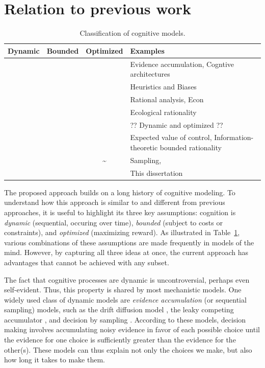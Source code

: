 \section{Relation to previous work}



\newcommand{\yes}{\checkmark &}
\begin{table}[tb]
  \caption{Classification of cognitive models.}
  \label{tab:comparison}
  \centering
  \begin{tabular}{ccc|p{\dimexpr\textwidth - 7cm}}
  \toprule
  Dynamic & Bounded & Optimized & Examples \\
  \midrule
  \yes & &
    Evidence accumulation, Cogntive architectures
  \\ & \yes & 
    Heuristics and Biases
  \\ & & \yes
    Rational analysis, Econ
  \\ \yes \yes &
    Ecological rationality
  \\ \yes & \yes 
    ?? Dynamic and optimized ??
  \\ & \yes \yes 
    Expected value of control, Information-theoretic bounded rationality
  \\ \yes \yes \textasciitilde &
    Sampling, 
  \\ \yes \yes \yes
    This dissertation 
  \\ \bottomrule
  \end{tabular}
\end{table}


The proposed approach builds on a long history of cognitive modeling. To understand how this approach is similar to and different from previous approaches, it is useful to highlight its three key assumptions: cognition is \emph{dynamic} (sequential, occuring over time), \emph{bounded} (subject to costs or constraints), and \emph{optimized} (maximizing reward). As illustrated in Table~\ref{tab:comparison}, various combinations of these assumptions are made frequently in models of the mind. However, by capturing all three ideas at once, the current approach has advantages that cannot be achieved with any subset.

The fact that cognitive processes are dynamic is uncontroversial, perhaps even self-evident. Thus, this property is shared by most mechanistic models. One widely used class of dynamic models are \emph{evidence accumulation} (or sequential sampling) models, such as the drift diffusion model \citep{ratcliff1978theory}, the leaky competing accumulator \citep{usher2001time}, and decision by sampling \citep{stewart2006decision}. According to these models, decision making involves accumulating noisy evidence in favor of each possible choice until the evidence for one choice is sufficiently greater than the evidence for the other(s). These models can thus explain not only the choices we make, but also how long it takes to make them.

